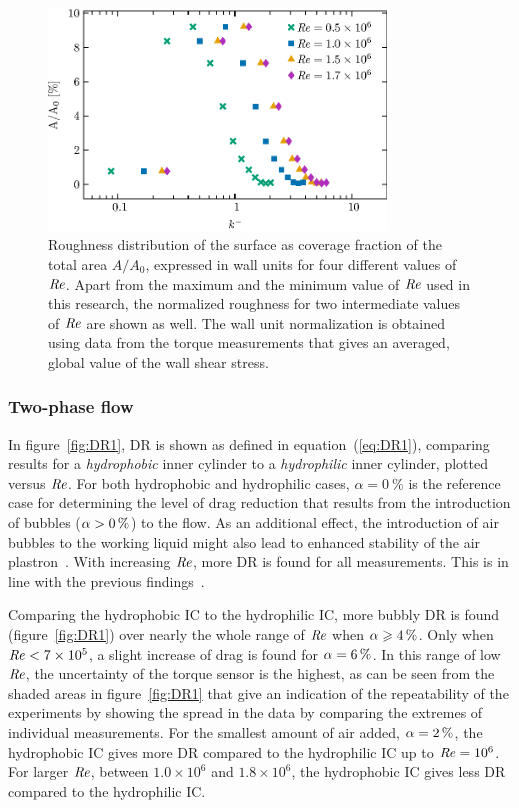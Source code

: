 \begin{figure}
\centering \includegraphics[width=0.8\textwidth]{Figures/fig6}
\caption{Roughness distribution of the surface as coverage fraction of the total area $A/A_0$, expressed in wall units for four different values of $\mbox{\textit{Re}}$. Apart from the maximum and the minimum value of $\mbox{\textit{Re}}$ used in this research, the normalized roughness for two intermediate values of $\mbox{\textit{Re}}$ are shown as well. The wall unit normalization is obtained using data from the torque measurements that gives an averaged, global value of the wall shear stress.} \label{fig:3Re}
\end{figure}


\subsubsection*{Two-phase flow}\noindent
In figure~\ref{fig:DR1}, DR is shown as defined in equation~(\ref{eq:DR1}), comparing results for a \textit{hydrophobic} inner cylinder to a \textit{hydrophilic} inner cylinder, plotted versus $\mbox{\textit{Re}}$. For both hydrophobic and hydrophilic cases, $\alpha = \SI{0}{\percent}$ is the reference case for determining the level of drag reduction that results from the introduction of bubbles ($\alpha > \SI{0}{\percent}$) to the flow. As an additional effect, the introduction of air bubbles to the working liquid might also lead to enhanced stability of the air plastron~\cite{Lv2014}. With increasing $\mbox{\textit{Re}}$, more DR is found for all measurements. This is in line with the previous findings~\citep{vandenBerg2005,vanGils2013,Spandan2018}. %

Comparing the {hydrophobic} IC to the hydrophilic IC, more bubbly DR is found (figure~\ref{fig:DR1}) over nearly the whole range of $\mbox{\textit{Re}}$  when $\alpha \geqslant \SI{4}{\percent}$. Only when $\mbox{\textit{Re}} < 7 \times 10^5$, a slight increase of drag is found for $\alpha = \SI{6}{\percent}$. In this range of low $\mbox{\textit{Re}}$, the uncertainty of the torque sensor is the highest, as can be seen from the shaded areas in figure~\ref{fig:DR1} that give an indication of the repeatability of the experiments by showing the spread in the data by comparing the extremes of individual measurements. For the smallest amount of air added, $\alpha = \SI{2}{\percent}$, the {hydrophobic} IC gives more DR compared to the hydrophilic IC up to $\mbox{\textit{Re}} = 10^6$. For larger $\mbox{\textit{Re}}$, between $1.0\times10^6$ and $1.8\times 10^6$, the {hydrophobic} IC gives less DR compared to the hydrophilic IC.


